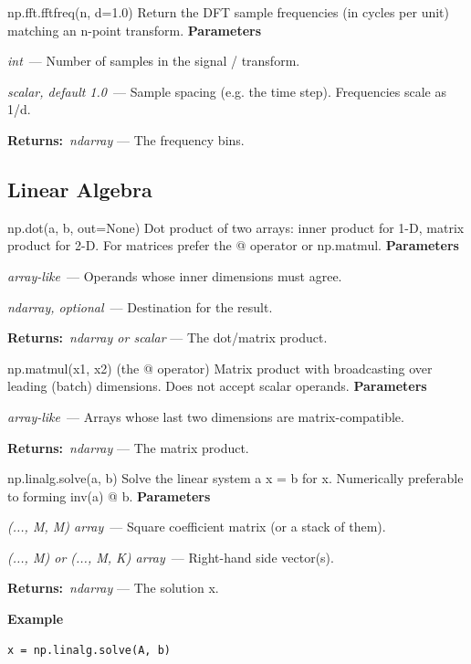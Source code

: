 \documentclass[10pt]{article}
\newenvironment{params}
  {\smallskip\textbf{\small\color{accent}Parameters}\par\nopagebreak
   \begin{description}[leftmargin=1.3em,itemsep=1.5pt,parsep=0pt,topsep=1pt,
      labelindent=0pt,style=sameline,font=\normalfont]}
  {\end{description}}
\newcommand{\pitem}[3]{\item[{\ttfamily\color{accent}#1}]{\itshape #2}\ --- #3}
\newcommand{\preturn}[2]{\smallskip\textbf{\small\color{accent}Returns:}\ {\itshape #1} --- #2\par}
\begin{document}
\begin{func}{np.fft.fftfreq(n, d=1.0)}
Return the DFT sample frequencies (in cycles per unit) matching an n-point transform.
\begin{params}
\pitem{n}{int}{Number of samples in the signal / transform.}
\pitem{d}{scalar, default 1.0}{Sample spacing (e.g. the time step). Frequencies scale as 1/d.}
\end{params}
\preturn{ndarray}{The frequency bins.}
\end{func}
\medskip

\subsection{Linear Algebra}
\begin{func}{np.dot(a, b, out=None)}
Dot product of two arrays: inner product for 1-D, matrix product for 2-D. For matrices prefer the @ operator or np.matmul.
\begin{params}
\pitem{a, b}{array-like}{Operands whose inner dimensions must agree.}
\pitem{out}{ndarray, optional}{Destination for the result.}
\end{params}
\preturn{ndarray or scalar}{The dot/matrix product.}
\end{func}
\medskip

\begin{func}{np.matmul(x1, x2)   (the @ operator)}
Matrix product with broadcasting over leading (batch) dimensions. Does not accept scalar operands.
\begin{params}
\pitem{x1, x2}{array-like}{Arrays whose last two dimensions are matrix-compatible.}
\end{params}
\preturn{ndarray}{The matrix product.}
\end{func}
\medskip

\begin{func}{np.linalg.solve(a, b)}
Solve the linear system a x = b for x. Numerically preferable to forming inv(a) @ b.
\begin{params}
\pitem{a}{(..., M, M) array}{Square coefficient matrix (or a stack of them).}
\pitem{b}{(..., M) or (..., M, K) array}{Right-hand side vector(s).}
\end{params}
\preturn{ndarray}{The solution x.}
\smallskip\textbf{\small\color{accent}Example}
\begin{lstlisting}[style=py]
x = np.linalg.solve(A, b)
\end{lstlisting}
\end{func}
\medskip
\end{document}
